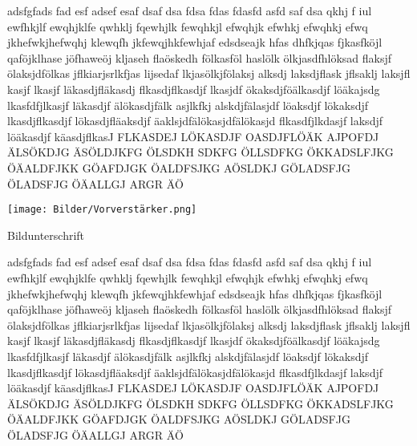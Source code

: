 adsfgfads fad esf adsef esaf dsaf dsa fdsa fdas fdasfd asfd saf dsa qkhj f iul ewfhkjlf ewqhjklfe qwhklj fqewhjlk fewqhkjl efwqhjk efwhkj efwqhkj efwq  jkhefwkjhefwqhj klewqfh jkfewqjhkfewhjaf edsdseajk hfas dhfkjqas fjkasfköjl qaföjklhase jöfhaweöj kljaseh flaöskedh fölkasföl haslölk ölkjasdfhlöksad flaksjf ölaksjdfölkas jflkiarjsrlkfjas lijsedaf lkjasölkjfölaksj alksdj laksdjflask jflsaklj laksjfl kasjf lkasjf läkasdjfläkasdj flkasdjflkasdjf lkasjdf ökaksdjföälkasdjf löäkajsdg lkasfdfjlkasjf läkasdjf älökasdjfälk asjlkfkj alskdjfälasjdf löaksdjf lökaksdjf lkasdjflkasdjf lökasdjfläaksdjf äaklsjdfälökasjdfälökasjd flkasdfjlkdasjf laksdjf löäkasdjf käasdjflkasJ FLKASDEJ LÖKASDJF OASDJFLÖÄK AJPOFDJ ÄLSÖKDJG ÄSÖLDJKFG ÖLSDKH SDKFG ÖLLSDFKG ÖKKADSLFJKG ÖÄALDFJKK GÖAFDJGK ÖALDFSJKG AÖSLDKJ GÖLADSFJG ÖLADSFJG ÖÄALLGJ ARGR ÄÖ

\begin{floatingfigure}{0.6\linewidth}
    \texttt{[image: Bilder/Vorverstärker.png]}
    \caption{Bildunterschrift}
\end{floatingfigure}

adsfgfads fad esf adsef esaf dsaf dsa fdsa fdas fdasfd asfd saf dsa qkhj f iul ewfhkjlf ewqhjklfe qwhklj fqewhjlk fewqhkjl efwqhjk efwhkj efwqhkj efwq  jkhefwkjhefwqhj klewqfh jkfewqjhkfewhjaf edsdseajk hfas dhfkjqas fjkasfköjl qaföjklhase jöfhaweöj kljaseh flaöskedh fölkasföl haslölk ölkjasdfhlöksad flaksjf ölaksjdfölkas jflkiarjsrlkfjas lijsedaf lkjasölkjfölaksj alksdj laksdjflask jflsaklj laksjfl kasjf lkasjf läkasdjfläkasdj flkasdjflkasdjf lkasjdf ökaksdjföälkasdjf löäkajsdg lkasfdfjlkasjf läkasdjf älökasdjfälk asjlkfkj alskdjfälasjdf löaksdjf lökaksdjf lkasdjflkasdjf lökasdjfläaksdjf äaklsjdfälökasjdfälökasjd flkasdfjlkdasjf laksdjf löäkasdjf käasdjflkasJ FLKASDEJ LÖKASDJF OASDJFLÖÄK AJPOFDJ ÄLSÖKDJG ÄSÖLDJKFG ÖLSDKH SDKFG ÖLLSDFKG ÖKKADSLFJKG ÖÄALDFJKK GÖAFDJGK ÖALDFSJKG AÖSLDKJ GÖLADSFJG ÖLADSFJG ÖÄALLGJ ARGR ÄÖ

